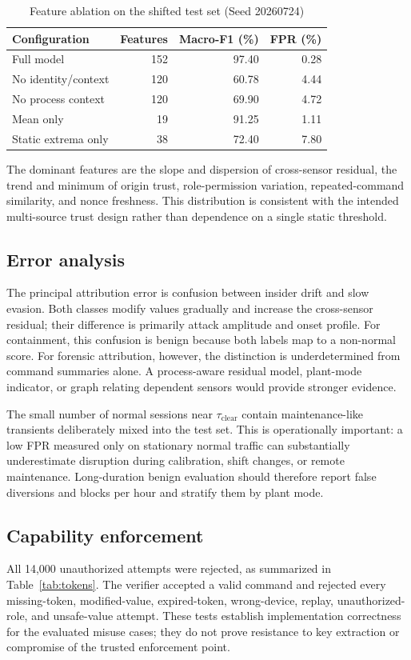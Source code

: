 \documentclass[journal]{IEEEtran}
\renewcommand{\arraystretch}{1.08}
\begin{document}
\begin{table}[t]
\centering
\caption{Feature ablation on the shifted test set (Seed 20260724)}
\label{tab:ablation}
\renewcommand{\arraystretch}{1.12}
\begin{tabular}{@{}lrrr@{}}
\toprule
\textbf{Configuration} & \textbf{Features} & \textbf{Macro-F1 (\%)} & \textbf{FPR (\%)} \\
\midrule
Full model & 152 & 97.40 & 0.28 \\
No identity/context & 120 & 60.78 & 4.44 \\
No process context & 120 & 69.90 & 4.72 \\
Mean only & 19 & 91.25 & 1.11 \\
Static extrema only & 38 & 72.40 & 7.80 \\
\bottomrule
\end{tabular}
\end{table}

The dominant features are the slope and dispersion of cross-sensor residual, the trend and minimum of origin trust, role-permission variation, repeated-command similarity, and nonce freshness. This distribution is consistent with the intended multi-source trust design rather than dependence on a single static threshold.

\subsection{Error analysis}
The principal attribution error is confusion between insider drift and slow evasion. Both classes modify values gradually and increase the cross-sensor residual; their difference is primarily attack amplitude and onset profile. For containment, this confusion is benign because both labels map to a non-normal score. For forensic attribution, however, the distinction is underdetermined from command summaries alone. A process-aware residual model, plant-mode indicator, or graph relating dependent sensors would provide stronger evidence.

The small number of normal sessions near $\tau_{\mathrm{clear}}$ contain maintenance-like transients deliberately mixed into the test set. This is operationally important: a low FPR measured only on stationary normal traffic can substantially underestimate disruption during calibration, shift changes, or remote maintenance. Long-duration benign evaluation should therefore report false diversions and blocks per hour and stratify them by plant mode.

\subsection{Capability enforcement}
All 14,000 unauthorized attempts were rejected, as summarized in Table~\ref{tab:tokens}. The verifier accepted a valid command and rejected every missing-token, modified-value, expired-token, wrong-device, replay, unauthorized-role, and unsafe-value attempt. These tests establish implementation correctness for the evaluated misuse cases; they do not prove resistance to key extraction or compromise of the trusted enforcement point.
\end{document}
